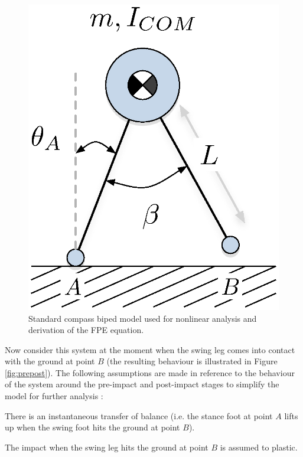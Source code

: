 \begin{figure}[!h]
	\centering
    \includegraphics[scale=0.75]{fig/fpe/compassbiped.eps}
  	\caption{Standard compass biped model used for nonlinear analysis  and derivation of the FPE equation.}
	\label{fig:compass}
\end{figure}

Now consider this system at the moment when the swing leg comes into contact with the ground at point $B$ (the resulting behaviour is illustrated in Figure \ref{fig:prepost}). The following assumptions are made in reference to the behaviour of the system around the pre-impact and post-impact stages to simplify the model for further analysis \cite{Wight:2008vt}: 

\hrulefill

\begin{assumption}
	There is an instantaneous transfer of balance (i.e. the stance foot at point $A$ lifts up when the swing foot hits the ground at point $B$).  
\end{assumption}

\begin{assumption}
	The impact when the swing leg hits the ground at point $B$ is assumed to plastic. 
\end{assumption}

